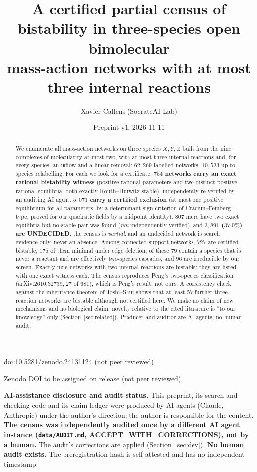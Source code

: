 \documentclass[11pt]{article}
\title{A certified partial census of bistability in three-species open bimolecular\\
mass-action networks with at most three internal reactions}
\author{Xavier Callens (SocrateAI Lab)}
\date{Preprint v1, 2026-11-11}
\begin{document}
\maketitle
\begin{center}\small doi:10.5281/zenodo.24131124 \quad (not peer reviewed)\end{center}

\begin{center}\small Zenodo DOI to be assigned on release \quad (not peer reviewed)\end{center}

\noindent\textbf{AI-assistance disclosure and audit status.} This preprint, its search and checking code and its claim ledger were
produced by AI agents (Claude, Anthropic) under the author's direction; the author is responsible for the content.
\textbf{The census was independently audited once by a different AI agent instance (\texttt{data/AUDIT.md}, ACCEPT\_WITH\_CORRECTIONS), not by a human.}
The audit's corrections are applied (Section~\ref{sec:dev}). \textbf{No human audit exists.} The preregistration hash is self-attested and has no independent timestamp.

\begin{abstract}
We enumerate all mass-action networks on three species $X,Y,Z$ built from the nine complexes of molecularity at most two, with at most three internal reactions and, for every species, an inflow and a linear removal: $62{,}269$ labelled networks, $10{,}523$ up to species relabelling. For each we look for a certificate. \textbf{$754$ networks carry an exact rational bistability witness} (positive rational parameters and two distinct positive rational equilibria, both exactly Routh--Hurwitz stable), independently re-verified by an auditing AI agent. \textbf{$5{,}071$ carry a certified exclusion} (at most one positive equilibrium for all parameters, by a determinant-sign criterion of Craciun--Feinberg type, proved for our quadratic fields by a midpoint identity). $807$ more have two exact equilibria but no stable pair was found (\emph{not} independently verified), and \textbf{$3{,}891$ ($37.0\%$) are UNDECIDED}: the census is \emph{partial}, and an undecided network is search evidence only, never an absence. Among connected-support networks, $727$ are certified bistable, $175$ of them minimal under edge deletion; of these $79$ contain a species that is never a reactant and are effectively two-species cascades, and $96$ are irreducible by our screen. Exactly nine networks with two internal reactions are bistable; they are listed with one exact witness each. The census reproduces Peng's two-species classification (arXiv:2610.32739, $27$ of $681$), which is Peng's result, not ours. A consistency check against the inheritance theorem of Joshi--Shiu shows that at least $57$ further three-reaction networks are bistable although not certified here. We make no claim of new mechanisms and no biological claim; novelty relative to the cited literature is ``to our knowledge'' only (Section~\ref{sec:related}). Producer and auditor are AI agents; no human audit.
\end{abstract}
\end{document}
